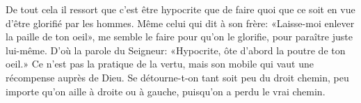 De tout cela il ressort que c'est être hypocrite
		que de faire quoi que ce soit en vue d'être glorifié par les hommes.
Même celui qui dit à son frère: «Laisse-moi enlever la paille de ton oeil»,
	me semble le faire pour qu'on le glorifie, pour paraître juste lui-même.
D'où la parole du Seigneur:
	«Hypocrite, ôte d'abord la poutre de ton oeil.»
Ce n'est pas la pratique de la vertu,
		mais son mobile qui vaut une récompense auprès de Dieu.
Se détourne-t-on tant soit peu du droit chemin,
	peu importe qu'on aille à droite ou à gauche, puisqu'on a perdu le vrai chemin.
